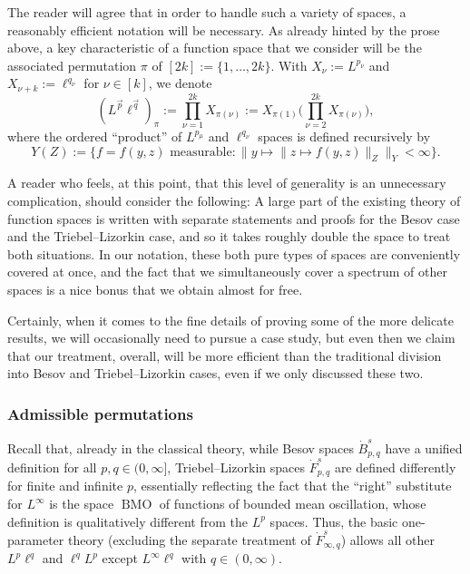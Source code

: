\documentclass[11pt, reqno]{amsart}
\theoremstyle{definition}
\theoremstyle{remark}
\numberwithin{equation}{section}
\newcommand{\vp}{\vec p}
\newcommand{\vq}{\vec q}
\newcommand{\BMO}{\operatorname{BMO}}
\newcommand{\Norm}[2]{\|#1\|_{#2}}
\newcommand{\bNorm}[2]{\big\|#1\big\|_{#2}}
\begin{document}
The reader will agree that in order to handle such a variety of spaces, a reasonably efficient notation will be necessary. As already hinted by the prose above, a key characteristic of a function space that we consider will be the associated permutation $\pi$ of $[2k]:=\{1,\ldots,2k\}$.
With $X_\nu:=L^{p_\nu}$ and $X_{\nu+k}:=\ell^{q_\nu}$ for $\nu\in[k]$, we denote
\begin{equation}\label{Lvpvq}
(L^{\vp}\ell^{\vq})_\pi:=\prod_{\nu=1}^{2k} X_{\pi(\nu)}:=X_{\pi(1)}\Bigg(\prod_{\nu=2}^{2k} X_{\pi(\nu)}\Bigg),
\end{equation}
where the ordered ``product'' of $L^{p_\mu}$ and $\ell^{q_\nu}$ spaces is defined recursively by
\begin{equation*}
Y(Z):=\Big\{f=f(y,z)\text{ measurable}: \bNorm{y\mapsto \Norm{z\mapsto f(y,z)}{Z}}{Y} <\infty\Big\}.
\end{equation*}

A reader who feels, at this point, that this level of generality is an unnecessary complication, should consider the following: A large part of the existing theory of function spaces is written with separate statements and proofs for the Besov case and the Triebel--Lizorkin case, and so it takes roughly double the space to treat both situations. In our notation, these both pure types of spaces are conveniently covered at once, and the fact that we simultaneously cover a spectrum of other spaces is a nice bonus that we obtain almost for free.

Certainly, when it comes to the fine details of proving some of the more delicate results, we will occasionally need to pursue a case study, but even then we claim that our treatment, overall, will be more efficient than the traditional division into Besov and Triebel--Lizorkin cases, even if we only discussed these two.

\subsubsection*{Admissible permutations}

Recall that, already in the classical theory, while Besov spaces $\dot B^s_{p,q}$ have a unified definition for all $p,q\in(0,\infty]$, Triebel--Lizorkin spaces $\dot F^s_{p,q}$ are defined differently for finite and infinite $p$, essentially reflecting the fact that the ``right'' substitute for $L^\infty$ is the space $\BMO$ of functions of bounded mean oscillation, whose definition is qualitatively different from the $L^p$ spaces. Thus, the basic one-parameter theory (excluding the separate treatment of $\dot F^s_{\infty,q}$) allows all other $L^p\ell^q$ and $\ell^qL^p$ except $L^\infty\ell^q$ with $q\in(0,\infty)$.
\end{document}
